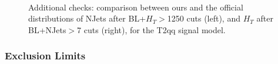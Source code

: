         \begin{figure}
        \centering
        \hspace{-1 cm}
        ~ %
        \caption{Additional checks: comparison between ours and the official distributions of NJets after BL+$H_T$$>$1250 cuts (left), and $H_T$ after BL+NJets$>$7 cuts (right), for the T2qq signal model.}
        \label{fig:last}
        \end{figure} 
        
        
\clearpage
\subsubsection{Exclusion Limits}

